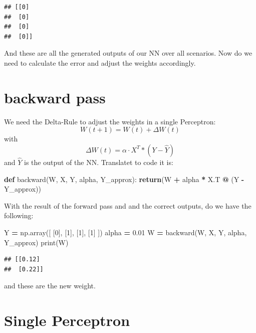 \documentclass[
]{book}
\newenvironment{Shaded}{\begin{snugshade}}{\end{snugshade}}
\newcommand{\BuiltInTok}[1]{#1}
\newcommand{\ControlFlowTok}[1]{\textcolor[rgb]{0.13,0.29,0.53}{\textbf{#1}}}
\newcommand{\DecValTok}[1]{\textcolor[rgb]{0.00,0.00,0.81}{#1}}
\newcommand{\FloatTok}[1]{\textcolor[rgb]{0.00,0.00,0.81}{#1}}
\newcommand{\KeywordTok}[1]{\textcolor[rgb]{0.13,0.29,0.53}{\textbf{#1}}}
\newcommand{\NormalTok}[1]{#1}
\newcommand{\OperatorTok}[1]{\textcolor[rgb]{0.81,0.36,0.00}{\textbf{#1}}}
\begin{document}
\begin{verbatim}
## [[0]
##  [0]
##  [0]
##  [0]]
\end{verbatim}

And these are all the generated outputs of our NN over all scenarios. Now do we need to calculate the error and adjust the weights accordingly.

\hypertarget{backward-pass}{%
\section{backward pass}\label{backward-pass}}

We need the Delta-Rule to adjust the weights in a single Perceptron:
\[
  W(t+1) = W(t) + \Delta W(t)
\]
with
\[
  \Delta W(t) = \alpha \cdot X^{T} * (Y - \hat{Y})
\]
and \(\hat{Y}\) is the output of the NN. Translatet to code it is:

\begin{Shaded}
\begin{Highlighting}[]
\KeywordTok{def}\NormalTok{ backward(W, X, Y, alpha, Y\_approx):}
    \ControlFlowTok{return}\NormalTok{(W }\OperatorTok{+}\NormalTok{ alpha }\OperatorTok{*}\NormalTok{ X.T }\OperatorTok{@}\NormalTok{ (Y }\OperatorTok{{-}}\NormalTok{ Y\_approx))}
\end{Highlighting}
\end{Shaded}

With the result of the forward pass and and the correct outputs, do we have the following:

\begin{Shaded}
\begin{Highlighting}[]
\NormalTok{Y }\OperatorTok{=}\NormalTok{ np.array([}
\NormalTok{  [}\DecValTok{0}\NormalTok{],}
\NormalTok{  [}\DecValTok{1}\NormalTok{],}
\NormalTok{  [}\DecValTok{1}\NormalTok{],}
\NormalTok{  [}\DecValTok{1}\NormalTok{]}
\NormalTok{])}
\NormalTok{alpha }\OperatorTok{=} \FloatTok{0.01}
\NormalTok{W }\OperatorTok{=}\NormalTok{ backward(W, X, Y, alpha, Y\_approx)}
\BuiltInTok{print}\NormalTok{(W)}
\end{Highlighting}
\end{Shaded}

\begin{verbatim}
## [[0.12]
##  [0.22]]
\end{verbatim}

and these are the new weight.

\hypertarget{single-perceptron-1}{%
\section{Single Perceptron}\label{single-perceptron-1}}
\end{document}
